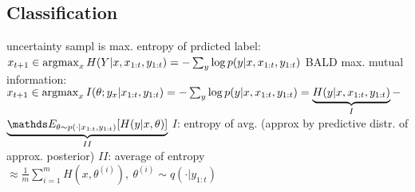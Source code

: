 \subsection{Classification}
uncertainty sampl is max. entropy of prdicted label: $x_{t+1} \in \operatorname*{argmax}_{x}H(Y|x,x_{1:t}, y_{1:t})
= - \sum_{y} \log p(y|x, x_{1:t}, y_{1:t})$
BALD max. mutual information: $x_{t+1} \in \operatorname*{argmax}_{x}I(\theta; y_{x}|x_{1:t}, y_{1:t})
= - \sum_{y} \log p(y|x, x_{1:t}, y_{1:t}) = \underbrace{H(y|x, x_{1:t}, y_{1:t})}_{I} - $
$\underbrace{\E[\theta \sim p(\cdot|x_{1:t}, y_{1:t})]{H(y|x, \theta)}}_{II}$
$I$: entropy of avg. (approx by predictive distr. of approx. posterior)
$II$: average of entropy $\approx \frac{1}{m} \sum_{i=1}^{m}H(x, \theta^{(i)}),\ \theta^{(i)}\sim q(\cdot|y_{1:t})$






